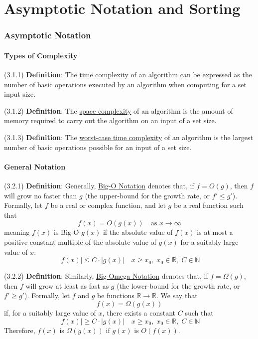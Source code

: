 \documentclass{article}
\newcommand{\separate}[1] {\vspace{#1 pt}\noindent}
\newcommand{\R}{\mathbb{R}}
\newcommand{\N}{\mathbb{N}}
\newcommand{\definition}[2]{(#1) \textbf{Definition}: #2}
\begin{document}
\newpage\part{Asymptotic Notation and Sorting}\label{part:2.ans}

\section{Asymptotic Notation}

\subsection{Types of Complexity}

\definition{3.1.1}{The \underline{time complexity} of an algorithm can be expressed as the number of basic operations executed by an algorithm when computing for a set input size.}

\separate{5}\definition{3.1.2}{The \underline{space complexity} of an algorithm is the amount of memory required to carry out the algorithm on an input of a set size.}

\separate{5}\definition{3.1.3}{The \underline{worst-case time complexity} of an algorithm is the largest number of basic operations possible for an input of a set size.}

\subsection{General Notation}

\definition{3.2.1}{Generally, \underline{Big-O Notation} denotes that, if \(f = O(g)\), then \(f\) will grow no faster than \(g\) (the upper-bound for the growth rate, or \(f' \leq g'\)).} Formally, let \(f\) be a real or complex function, and let \(g\) be a real function such that
\begin{equation}
    f(x) = O(g(x)) \quad\text{as } x \rightarrow \infty
\end{equation}
meaning \(f(x)\) is Big-O \(g(x)\) if the absolute value of \(f(x)\) is at most a positive constant multiple of the absolute value of \(g(x)\) for a suitably large value of \(x\):
\begin{equation}
    |f(x)| \leq C \cdot |g(x)| \quad x \geq x_0, \; x_0 \in \R, \; C \in \N
\end{equation}

\separate{5}\definition{3.2.2}{Similarly, \underline{Big-Omega Notation} denotes that, if \(f=\Omega(g)\), then \(f\) will grow at least as fast as \(g\) (the lower-bound for the growth rate, or \(f' \geq g'\)).} Formally, let \(f\) and \(g\) be functions \(\R \rightarrow \R\). We say that 
\begin{equation}
    f(x) = \Omega(g(x))
\end{equation}
if, for a suitably large value of \(x\), there exists a constant \(C\) such that
\begin{equation}
    |f(x)| \geq C \cdot |g(x)| \quad x \geq x_0, \; x_0 \in \R, \; C \in \N
\end{equation}
Therefore, \(f(x)\) is \(\Omega(g(x))\) if \(g(x)\) is \(O(f(x))\).
\end{document}
